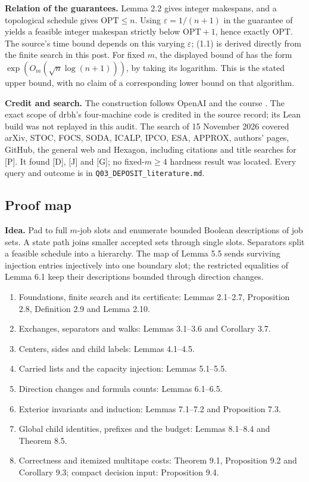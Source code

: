 \documentclass[11pt,a4paper]{article}
\theoremstyle{plain}
\theoremstyle{definition}
\begin{document}
\smallskip
\noindent\textbf{Relation of the guarantees.}
Lemma 2.2 gives integer makespans, and a topological schedule gives $\mathrm{OPT}\leq n$.
Using $\varepsilon=1/(n+1)$ in the guarantee of \cite[Theorem~1]{A} yields a feasible integer makespan strictly below $\mathrm{OPT}+1$, hence exactly $\mathrm{OPT}$.
The source's time bound depends on this varying $\varepsilon$; (1.1) is derived directly from the finite search in this post.
For fixed $m$, the displayed bound of \cite[Theorem~1.1]{N} has the form $\exp(O_m(\sqrt n\log(n+1)))$, by taking its logarithm. This is the stated upper bound, with no claim of a corresponding lower bound on that algorithm.

\smallskip
\noindent\textbf{Credit and search.}
The construction follows OpenAI \cite[Sections 2--9]{P} and the course \cite[lessons 1--8]{L}.
The exact scope of drbh's four-machine code is credited in the source record; its Lean build was not replayed in this audit.
The search of 15 November 2026 covered arXiv, STOC, FOCS, SODA, ICALP, IPCO, ESA, APPROX, authors' pages, GitHub, the general web and Hexagon, including citations and title searches for [P]. It found [D], [J] and [G]; no fixed-$m\geq4$ hardness result was located. Every query and outcome is in \texttt{Q03\_DEPOSIT\_literature.md}.


\subsection{Proof map}

\noindent\textbf{Idea.} Pad to full $m$-job slots and enumerate bounded Boolean descriptions of job sets. A state path joins smaller accepted sets through single slots. Separators split a feasible schedule into a hierarchy. The map of Lemma 5.5 sends surviving injection entries injectively into one boundary slot; the restricted equalities of Lemma 6.1 keep their descriptions bounded through direction changes.

\begin{enumerate}[nosep]
\item Foundations, finite search and its certificate: Lemmas 2.1--2.7, Proposition 2.8, Definition 2.9 and Lemma 2.10.
\item Exchanges, separators and walks: Lemmas 3.1--3.6 and Corollary 3.7.
\item Centers, sides and child labels: Lemmas 4.1--4.5.
\item Carried lists and the capacity injection: Lemmas 5.1--5.5.
\item Direction changes and formula counts: Lemmas 6.1--6.5.
\item Exterior invariants and induction: Lemmas 7.1--7.2 and Proposition 7.3.
\item Global child identities, prefixes and the budget: Lemmas 8.1--8.4 and Theorem 8.5.
\item Correctness and itemized multitape costs: Theorem 9.1, Proposition 9.2 and Corollary 9.3; compact decision input: Proposition 9.4.
\end{enumerate}
\end{document}
